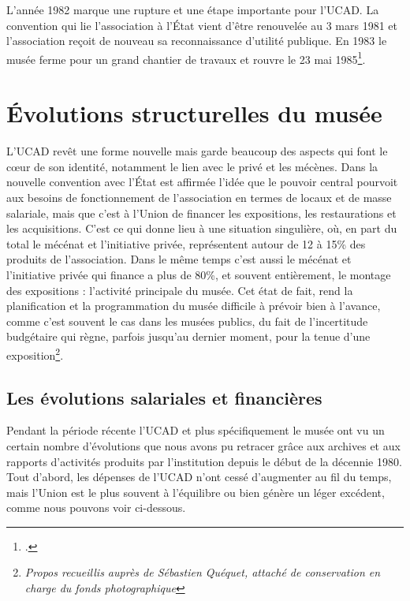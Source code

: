 L'année 1982 marque une rupture et une étape importante pour l'UCAD. La convention qui lie l'association à l'État vient d'être renouvelée au 3 mars 1981 et l'association reçoit de nouveau sa reconnaissance d'utilité publique. En 1983 le musée ferme pour un grand chantier de travaux et rouvre le 23 mai 1985\footnote{\cite{noauthor__2006}.}.

\section{Évolutions structurelles du musée }

L'UCAD revêt une forme nouvelle mais garde beaucoup des aspects qui font le cœur de son identité, notamment le lien avec le privé et les mécènes. Dans la nouvelle convention avec l'État est affirmée l'idée que le pouvoir central pourvoit aux besoins de fonctionnement de l'association en termes de locaux et de masse salariale, mais que c'est à l'Union de financer les expositions, les restaurations et les acquisitions. C'est ce qui donne lieu à une situation singulière, où, en part du total le mécénat et l'initiative privée, représentent autour de 12 à 15\% des produits de l'association. Dans le même temps c'est aussi le mécénat et l'initiative privée qui finance a plus de 80\%, et souvent entièrement, le montage des expositions : l'activité principale du musée. Cet état de fait, rend la planification et la programmation du musée difficile à prévoir bien à l'avance, comme c'est souvent le cas dans les musées publics, du fait de l'incertitude budgétaire qui règne, parfois jusqu'au dernier moment, pour la tenue d'une exposition\footnote{\textit{Propos recueillis auprès de Sébastien Quéquet, attaché de conservation en charge du fonds photographique}}.


\subsection{Les évolutions salariales et financières}

Pendant la période récente l'UCAD et plus spécifiquement le musée ont vu un certain nombre d'évolutions que nous avons pu retracer grâce aux archives et aux rapports d'activités produits par l'institution depuis le début de la décennie 1980. Tout d'abord, les dépenses de l'UCAD n'ont cessé d'augmenter au fil du temps, mais l'Union est le plus souvent à l'équilibre ou bien génère un léger excédent, comme nous pouvons voir ci-dessous.

